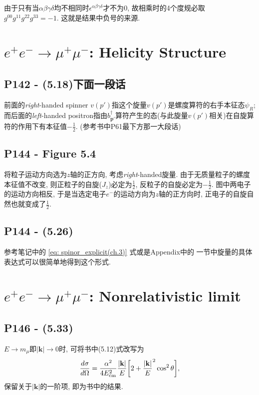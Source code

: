由于只有当$\alpha\beta\gamma\delta$均不相同时$\epsilon^{\alpha\beta\gamma\delta}$才不为$0$, 故相乘时的4个度规必取$g^{00}g^{11}g^{22}g^{33}=-1$.
这就是结果中负号的来源.

\section{\texorpdfstring{$e^+e^- \rightarrow \mu^+\mu^-$}:: Helicity Structure}

\subsection{P142 - (5.18)下面一段话}

前面的\textit{right}-handed spinner $v(p')$指这个旋量$v(p')$是螺度算符的右手本征态$\psi_R$; 而后面的\textit{left}-handed positron指由$b^\dagger_{\mathbf{p}'}$算符产生的态(与此旋量$v(p')$相关)在自旋算符的作用下有本征值$-\frac{1}{2}$. (参考书中P61最下方那一大段话)

\subsection{P144 - Figure 5.4}

将粒子运动方向选为$z$轴的正方向, 考虑\textit{right}-handed旋量.
由于无质量粒子的螺度本征值不改变, 则正粒子的自旋($J_z$)必定为$\frac{1}{2}$, 反粒子的自旋必定为$-\frac{1}{2}$.
图中两电子的运动方向相反, 于是当选定电子$e^-$的运动方向为$z$轴的正方向时, 正电子的自旋自然也就变成了$\frac{1}{2}$.

\subsection{P144 - (5.26)}

参考笔记中的 \eqref{eq: spinor_explicit(ch.3)} 式或是Appendix中的  一节中旋量的具体表达式可以很简单地得到这个形式.

\section{\texorpdfstring{$e^+e^- \rightarrow \mu^+\mu^-$}:: Nonrelativistic limit}

\subsection{P146 - (5.33)}

$E\rightarrow m_{\mu}$即$|\mathbf{k}|\rightarrow 0$时, 可将书中(5.12)式改写为
\begin{equation}
  \frac{d\sigma}{d\Omega}=\frac{\alpha^2}{4E^2_{\rm cm}}\frac{|\mathbf{k}|}{E}\biggl[2+ \frac{|\mathbf{k}|}{E}^2 \cos^2\theta\biggr],
\end{equation}
保留关于$|\mathbf{k}|$的一阶项, 即为书中的结果.
